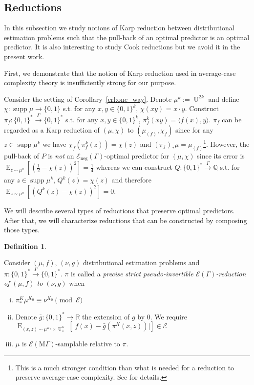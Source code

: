 \documentclass{article}
\numberwithin{equation}{section}
\theoremstyle{definition}
\newtheorem{definition}{Definition}[section]
\theoremstyle{plain}
\newcommand{\Bool}{\{0,1\}}
\newcommand{\Words}{{\Bool^*}}
\DeclareMathOperator{\Supp}{supp}
\DeclareMathOperator{\E}{E}
\DeclareMathOperator{\Un}{U}
\newcommand{\Rats}{\mathbb{Q}}
\newcommand{\Reals}{\mathbb{R}}
\newcommand{\Abs}[1]{\lvert #1 \rvert}
\newcommand{\Chev}[1]{\langle #1 \rangle}
\newcommand{\MGrow}{\mathrm{M}\Gamma}
\newcommand{\Fall}{\mathcal{E}}
\newcommand{\EG}{\Fall(\Gamma)}
\newcommand{\EMG}{\Fall(\MGrow)}
\newcommand{\Scheme}{\xrightarrow{\Gamma}}
\begin{document}
\subsection{Reductions}

In this subsection we study notions of Karp reduction between distributional estimation problems such that the pull-back of an optimal predictor is an optimal predictor. It is also interesting to study Cook reductions but we avoid it in the present work.

First, we demonstrate that the notion of Karp reduction used in average-case complexity theory is insufficiently strong for our purpose. 

Consider the setting of Corollary~\ref{crl:one_way}. Denote $\mu^k:=\Un^{2k}$ and define ${\chi: \Supp \mu \rightarrow \Bool}$ s.t. for any $x,y \in \Bool^k$, $\chi(xy)$ = $x \cdot y$. Construct $\pi_f: \Words \Scheme \Words$ s.t. for any $x,y \in \Bool^k$, ${\pi_f^k(xy) = \Chev{f(x),y}}$. $\pi_f$ can be regarded as a Karp reduction of $(\mu, \chi)$ to $(\mu_{(f)},\chi_f)$ since for any ${z \in \Supp \mu^k}$ we have $\chi_f(\pi_f^k(z))=\chi(z)$ and $(\pi_f)_*\mu=\mu_{(f)}$\footnote{This is a much stronger condition than what is needed for a reduction to preserve average-case complexity. See \cite{Bogdanov_2006} for details.}. However, the pull-back of $P$ is \emph{not} an $\Fall_{\text{neg}}(\Gamma)$-optimal predictor for $(\mu,\chi)$ since its error is $\E_{z \sim \mu^k}[(\frac{1}{2}-\chi(z))^2]=\frac{1}{4}$ whereas we can construct $Q: \Words \Scheme \Rats$ s.t. for any $z \in \Supp \mu^k$, $Q^k(z)=\chi(z)$ and therefore $\E_{z \sim \mu^k}[(Q^k(z)-\chi(z))^2]=0$.

We will describe several types of reductions that preserve optimal predictors. After that, we will characterize reductions that can be constructed by composing those types.

\begin{samepage}
\begin{definition}
\label{def:psp_reduce}

Consider $(\mu,f)$, $(\nu,g)$ distributional estimation problems and ${\pi: \Words \Scheme \Words}$. $\pi$ is called a \emph{precise strict pseudo-invertible $\EG$-reduction of $(\mu,f)$ to $(\nu,g)$} when

\begin{enumerate}[(i)]

\item\label{con:def__psp_reduce__dist} $\pi_*^K\mu^{K_0} \equiv \nu^{K_0} \pmod \Fall$

\item\label{con:def__psp_reduce__fun} Denote ${\bar{g}: \Words \rightarrow \Reals}$ the extension of $g$ by 0. We require $\E_{(x,z) \sim \mu^{K_0} \times \Un_\pi^{K}}[\Abs{f(x)-\bar{g}(\pi^{K}(x,z))}] \in \Fall$

\item\label{con:def__psp_reduce__smp} $\mu$ is $\EMG$-samplable relative to $\pi$.

\end{enumerate}

\end{definition}
\end{samepage}
\end{document}
